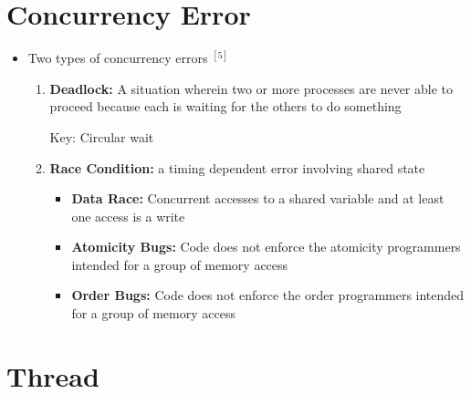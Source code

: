 \documentclass[12pt]{article}
\begin{document}
\section*{Concurrency Error}

\begin{itemize}
    \item Two types of concurrency errors $^{[5]}$

    \begin{enumerate}[1.]
        \item \textbf{Deadlock:} A situation wherein two or more processes
        are never able to proceed because each is waiting for the others
        to do something

        \bigskip

        Key: Circular wait

        \bigskip

        \item \textbf{Race Condition:} a timing dependent error
        involving shared state

        \begin{itemize}
            \item \textbf{Data Race:} Concurrent accesses to a shared variable
            and at least one access is a write
            \item \textbf{Atomicity Bugs:} Code does not enforce the atomicity
            programmers intended for a group of memory access
            \item \textbf{Order Bugs:} Code does not enforce the order programmers
            intended for a group of memory access
        \end{itemize}
    \end{enumerate}
\end{itemize}

\section*{Thread}
\end{document}
